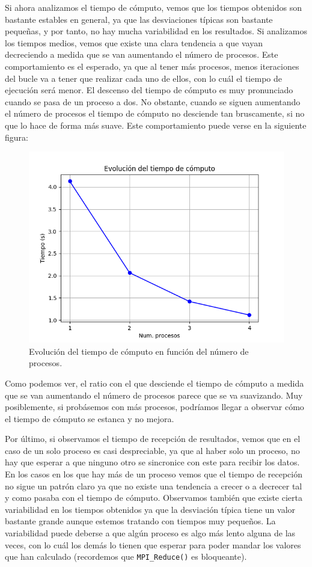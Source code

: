 \documentclass[11pt,a4paper]{article}
\begin{document}
Si ahora analizamos el tiempo de cómputo, vemos que los tiempos obtenidos son bastante estables
en general, ya que las desviaciones típicas son bastante pequeñas, y por tanto, no hay mucha
variabilidad en los resultados. Si analizamos los tiempos medios, vemos que existe una clara
tendencia a que vayan decreciendo a medida que se van aumentando el número de procesos. Este
comportamiento es el esperado, ya que al tener más procesos, menos iteraciones del bucle va a
tener que realizar cada uno de ellos, con lo cuál el tiempo de ejecución será menor. El descenso
del tiempo de cómputo es muy pronunciado cuando se pasa de un proceso a dos. No obstante, cuando
se siguen aumentando el número de procesos el tiempo de cómputo no desciende tan bruscamente, si
no que lo hace de forma más suave. Este comportamiento puede verse en la siguiente figura:

\begin{figure}[H]
  \centering
  \includegraphics[scale=0.5]{img/evo-comp}
  \caption{Evolución del tiempo de cómputo en función del número de procesos.}
  \label{fig:comp}
\end{figure}

Como podemos ver, el ratio con el que desciende el tiempo de cómputo a medida que se van
aumentando el número de procesos parece que se va suavizando. Muy posiblemente, si probásemos
con más procesos, podríamos llegar a observar cómo el tiempo de cómputo se estanca y no mejora.

Por último, si observamos el tiempo de recepción de resultados, vemos que en el caso de un solo
proceso es casi despreciable, ya que al haber solo un proceso, no hay que esperar a que ninguno
otro se sincronice con este para recibir los datos. En los casos en los que hay más de un proceso
vemos que el tiempo de recepción no sigue un patrón claro ya que no existe una tendencia
a crecer o a decrecer tal y como pasaba con el tiempo de cómputo. Observamos también que existe
cierta variabilidad en los tiempos obtenidos ya que la desviación típica tiene un valor bastante
grande aunque estemos tratando con tiempos muy pequeños. La variabilidad puede deberse a que
algún proceso es algo más lento alguna de las veces, con lo cuál los demás lo tienen que esperar
para poder mandar los valores que han calculado (recordemos que \texttt{MPI\_Reduce()} es
bloqueante).
\end{document}
